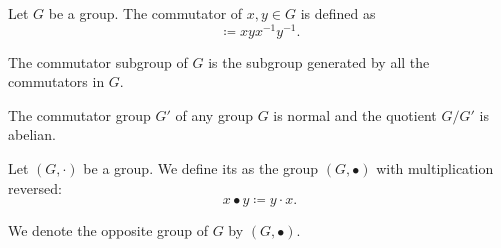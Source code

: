 \begin{definition}\label{def:group_commutator}
  Let \( G \) be a group. The commutator of \( x, y \in G \) is defined as
  \begin{equation*}
    [x, y] \coloneqq xyx^{-1}y^{-1}.
  \end{equation*}

  The commutator subgroup of \( G \) is the subgroup generated by all the commutators in \( G \).
\end{definition}

\begin{proposition}\label{thm:quotient_by_commutator_subgroup}\cite[proposition 7.4]{Knapp2016BAlg}
  The commutator group \( G' \) of any group \( G \) is normal and the quotient \( G / G' \) is abelian.
\end{proposition}

\begin{definition}\label{def:opposite_group}
  Let \( (G, \cdot) \) be a group. We define its  as the group \( (G, \bullet) \) with multiplication reversed:
  \begin{equation*}
    x \bullet y \coloneqq y \cdot x.
  \end{equation*}

  We denote the opposite group of \( G \) by \( (G, \bullet) \).
\end{definition}

